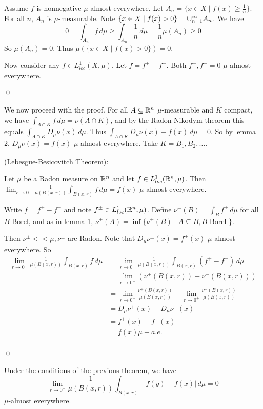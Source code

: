 \documentclass[x11names,reqno,14pt]{extarticle}
\newcommand{\seq}[2][\oo]{_{#2 = 1}^#1}
\newcommand{\cupn}[1][\oo]{\cup\seq[#1]{n}}
\newcommand{\Dmn}{D_\mu\nu}
\newcommand{\loc}{loc}
\begin{document}
\proof

Assume $f$ is nonnegative $\mu$-almost everywhere. Let $A_n = \{x\in X \mid f(x) \geq\frac{1}{n}\}$. For all $n$, $A_n$ is $\mu$-measurable. Note $\{x\in X \mid f(x) > 0 \} = \cupn A_n$. We have
\[
0 = \int_{A_n}f\,d\mu \geq \int_{A_n}\frac{1}{n}\,d\mu = \frac{1}{n}\mu(A_n) \geq 0
\]
So $\mu(A_n) = 0$. Thus $\mu(\{x\in X \mid f(x) > 0 \}) = 0$. 

Now consider any $f\in L^1_{\loc}(X,\mu)$. Let $f = f^+ - f^-$. Both $f^+, f^- = 0$ $\mu$-almost everywhere. 

\qed

We now proceed with the proof. For all $A \subseteq \mathbb{R}^n$ $\mu$-measurable and $K$ compact, we have $\int_{A\cap K}f\,d\mu = \nu(A\cap K)$, and by the Radon-Nikodym theorem this equals $\int_{A\cap K}\Dmn(x)\,d\mu$. Thus $\int_{A\cap K}\Dmn(x) - f(x)\,d\mu = 0$. So by lemma 2, $\Dmn(x) = f(x)$ $\mu$-almost everywhere. Take $K = B_1, B_2, \dots $. 

\thm (Lebesgue-Besicovitch Theorem):

Let $\mu$ be a Radon measure on $\mathbb{R}^n$ and let $f\in L^1_{\loc}(\R^n,\mu)$. Then $\lim_{r\to0^+}\frac{1}{\mu(B(x, r))}\int_{B(x, r)}f\,d\mu = f(x)$ $\mu$-almost everywhere.

\proof

Write $f = f^+ - f^-$ and note $f^{\pm}\in L^1_{\loc}(\R^n,\mu)$. Define $\nu^{\pm}(B) = \int_Bf^{\pm}\,d\mu$ for all $B$ Borel, and as in lemma 1, $\nu^{\pm}(A) = \inf\{\nu^{\pm}(B)\mid A \subseteq B, B$ Borel $\}$. 

Then $\nu^{\pm}<<\mu, \nu^{\pm}$ are Radon. Note that $\Dmn^{\pm}(x) = f^{\pm}(x)$ $\mu$-almost everywhere. So
\begin{align*}
\lim_{r\to0^+}\frac{1}{\mu(B(x, r))}\int_{B(x, r)}f\,d\mu & = \lim_{r\to0^+}\frac{1}{\mu(B(x, r))}\int_{B(x, r)}(f^+ - f^-)\,d\mu \\
& = \lim_{r\to0^+}\left(\nu^+(B(x, r)) - \nu^-(B(x, r))\right) \\
& = \lim_{r\to0^+}\frac{\nu^+(B(x, r))}{\mu(B(x, r))} - \lim_{r\to0^+}\frac{\nu^-(B(x, r))}{\mu(B(x, r))} \\
& = \Dmn^+(x) - \Dmn^-(x) \\
& = f^+(x) - f^-(x) \\
& = f(x) \mu-a.e. \\
\end{align*}

\qed

\thm Under the conditions of the previous theorem, we have 
\[
\lim_{r\to0^+}\frac{1}{\mu(B(x, r))}\int_{B(x, r)}|f(y) - f(x)|\,d\mu = 0
\]
$\mu$-almost everywhere. 
\end{document}
